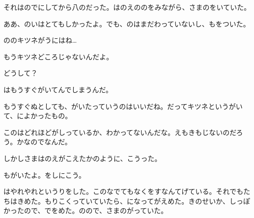 それはのでにしてから八のだった。はのえののをみながら、さまのをいていた。

ああ、のいはとてもしかったよ。でも、のはまだわっていないし、もをついた。

ののキツネがうにはね…

もうキツネどころじゃないんだよ。

どうして？

はもうすぐがいてんでしまうんだ。

もうすぐぬとしても、がいたっていうのはいいだね。だってキツネというがいて、によかったもの。

このはどれほどがしっているか、わかってないんだな。えもきもじないのだろう。かなのでなんだ。

しかしさまはのえがこえたかのように、こうった。

もがいたよ。をしにこう。

はやれやれというりをした。このなでてもなくをすなんてげている。それでもたちはきめた。もりこくっていていたら、になってがえめた。きのせいか、しっぽかったので、でをめた。のので、さまのがっていた。


